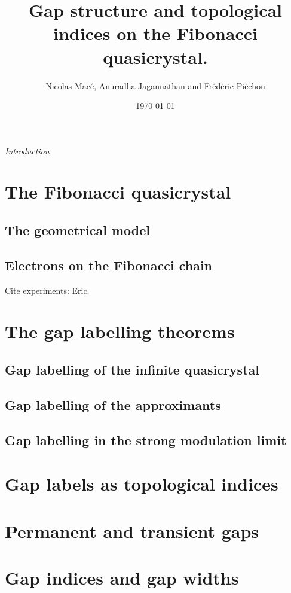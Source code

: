 \documentclass[a4paper]{jpconf}
\begin{document}
\title{Gap structure and topological indices on the Fibonacci quasicrystal.}
\author{Nicolas Macé, Anuradha Jagannathan and Frédéric Piéchon}
\address{Laboratoire de physique des Solides, Université Paris-Saclay, 91400 Orsay, France}


\date{\today}

\begin{abstract}
\end{abstract}


\emph{Introduction}

\section{The Fibonacci quasicrystal}

\subsection{The geometrical model}

\subsection{Electrons on the Fibonacci chain}

Cite experiments: Eric.

\section{The gap labelling theorems}

\subsection{Gap labelling of the infinite quasicrystal}

\subsection{Gap labelling of the approximants}

\subsection{Gap labelling in the strong modulation limit}

\section{Gap labels as topological indices}

\section{Permanent and transient gaps}

\section{Gap indices and gap widths}



\end{document}
